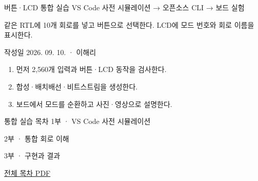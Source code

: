 
\renewcommand{\labonehome}{\hyperlink{integrated-cli-contents}{\contentsbutton}}
\renewcommand{\legacySource}[1]{}
\providecommand{\terminalbox}[1]{\par\vspace{0.15cm}{\setlength{\fboxsep}{7pt}\colorbox{black}{\parbox{\dimexpr\textwidth-14pt\relax}{\color{white}\ttfamily\fontsize{7}{9}\selectfont #1}}}\par\vspace{0.15cm}}

\begingroup
\renewcommand{\small}{\fontsize{9}{11}\selectfont}
\begin{frame}{버튼·LCD 통합 실습}\relax
\small
VS Code 사전 시뮬레이션 → 오픈소스 CLI → 보드 실험\par\vspace{0.22cm}같은 RTL에 10개 회로를 넣고 버튼으로 선택한다. LCD에 모드 번호와 회로 이름을 표시한다.\par\vspace{0.22cm}작성일 2026. 09. 10. · 이해리\par\begin{enumerate}\setlength{\itemsep}{0.22cm}
\item 먼저 2,560개 입력과 버튼·LCD 동작을 검사한다.
\item 합성·배치배선·비트스트림을 생성한다.
\item 보드에서 모드를 순환하고 사진·영상으로 설명한다.
\end{enumerate}

\end{frame}

\begin{frame}[label=integrated-cli-contents]{통합 실습 목차}\relax
\small
1부 · VS Code 사전 시뮬레이션\par{}\par\vspace{0.4cm}
2부 · 통합 회로 이해\par{}\par\vspace{0.4cm}
3부 · 구현과 결과\par{}\par\vspace{0.2cm}
\par\vspace{0.3cm}
\href{04.LAB1_00_CONTENTS.pdf}{전체 목차 PDF}
\end{frame}

